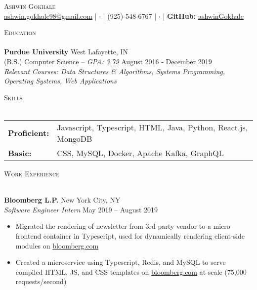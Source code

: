 \documentclass[letterpaper, 10pt]{article}
\newcommand{\lineunder} {
    \vspace*{-8pt} \\
    \hspace*{-18pt} \hrulefill \\
}
\newcommand{\header} [1] {
    {
        \hspace*{-18pt}\vspace*{6pt}
        {\large\textsc{#1}}
    }
    \vspace*{-6pt} \lineunder
}
\newcommand{\contact} [2] {
    \vspace*{-10pt}
    \begin{center}
        {\Huge \scshape {#1}}
        \vspace*{5pt}
        \\ 
        #2
    \end{center}
    \vspace*{-10pt}
}
\begin{document}
\vspace*{20pt}



\vspace*{-10pt}
\contact{Ashwin Gokhale}{
    {\fontsize{11}{11}\selectfont
	\href{mailto:ashwin.gokhale98@gmail.com}{ashwin.gokhale98@gmail.com} |
	$\cdot$ | (925)-548-6767 | $\cdot$ |
	\textbf{GitHub:}
    \href{https://goo.gl/R79aeK}{ashwinGokhale}
    }
}

\vspace{10pt}

\header{Education}
\textbf{Purdue University} 
\hfill West Lafayette, IN\\
(B.S.) Computer Science -- \textit{GPA: 3.79}
\hfill August 2016 - December 2019
\\

\textit{Relevant Courses: Data Structures \& Algorithms, Systems Programming, Operating Systems, Web Applications}

\vspace{2mm}

\vspace{1mm}
\header{Skills}
\vspace{1mm}
\begin{tabular}{ l l }
	\textbf{Proficient:} & Javascript, Typescript, HTML, Java, Python, React.js, MongoDB \\
	\textbf{Basic:}      & CSS, MySQL, Docker, Apache Kafka, GraphQL \\
\end{tabular}
\vspace{2mm}

\header{Work Experience}
\vspace{1mm}

\textbf{Bloomberg L.P.} \hfill New York City, NY\\
\textit{Software Engineer Intern} \hfill May 2019 -- August 2019\\
\vspace{-1mm}
\begin{itemize} \itemsep 1pt
	\item Migrated the rendering of newsletter from 3rd party vendor to a micro frontend container in Typescript, used for dynamically rendering client-side modules on \href{https://www.bloomberg.com}{bloomberg.com}
	\item Created a microservice using Typescript, Redis, and MySQL to serve compiled HTML, JS, and CSS templates on
	\href{https://www.bloomberg.com}{bloomberg.com} at scale (75,000 requests/second)
\end{itemize}
\end{document}
